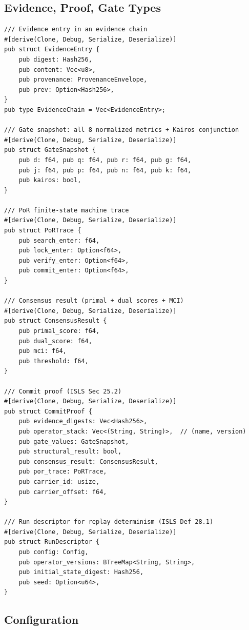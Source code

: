 \documentclass[10pt,a4paper]{article}
\theoremstyle{definition}\newtheorem{definition}{Def}[section]
\theoremstyle{plain}\newtheorem{theorem}{Thm}[section]
\begin{document}
\subsection{Evidence, Proof, Gate Types}

\begin{lstlisting}[style=rust]
/// Evidence entry in an evidence chain
#[derive(Clone, Debug, Serialize, Deserialize)]
pub struct EvidenceEntry {
    pub digest: Hash256,
    pub content: Vec<u8>,
    pub provenance: ProvenanceEnvelope,
    pub prev: Option<Hash256>,
}
pub type EvidenceChain = Vec<EvidenceEntry>;

/// Gate snapshot: all 8 normalized metrics + Kairos conjunction
#[derive(Clone, Debug, Serialize, Deserialize)]
pub struct GateSnapshot {
    pub d: f64, pub q: f64, pub r: f64, pub g: f64,
    pub j: f64, pub p: f64, pub n: f64, pub k: f64,
    pub kairos: bool,
}

/// PoR finite-state machine trace
#[derive(Clone, Debug, Serialize, Deserialize)]
pub struct PoRTrace {
    pub search_enter: f64,
    pub lock_enter: Option<f64>,
    pub verify_enter: Option<f64>,
    pub commit_enter: Option<f64>,
}

/// Consensus result (primal + dual scores + MCI)
#[derive(Clone, Debug, Serialize, Deserialize)]
pub struct ConsensusResult {
    pub primal_score: f64,
    pub dual_score: f64,
    pub mci: f64,
    pub threshold: f64,
}

/// Commit proof (ISLS Sec 25.2)
#[derive(Clone, Debug, Serialize, Deserialize)]
pub struct CommitProof {
    pub evidence_digests: Vec<Hash256>,
    pub operator_stack: Vec<(String, String)>,  // (name, version)
    pub gate_values: GateSnapshot,
    pub structural_result: bool,
    pub consensus_result: ConsensusResult,
    pub por_trace: PoRTrace,
    pub carrier_id: usize,
    pub carrier_offset: f64,
}

/// Run descriptor for replay determinism (ISLS Def 28.1)
#[derive(Clone, Debug, Serialize, Deserialize)]
pub struct RunDescriptor {
    pub config: Config,
    pub operator_versions: BTreeMap<String, String>,
    pub initial_state_digest: Hash256,
    pub seed: Option<u64>,
}
\end{lstlisting}

\subsection{Configuration}
\end{document}
